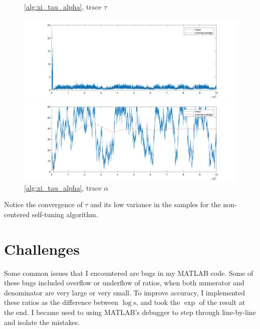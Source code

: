 \documentclass{siamart1116}
\begin{document}
\begin{figure}[!htb]
    \begin{minipage}{0.48\textwidth}
        \centering
        \caption{\label{fig:moon_noncentered_tau} \cref{alg:xi_tau_alpha}, trace $\tau$}
        \includegraphics[width=\linewidth]{graphics/moons/noncentered/trace_tau.png}
    \end{minipage} \hfill
    \begin{minipage}{0.48\textwidth}
        \centering
        \caption{\label{fig:moon_noncentered_alpha} \cref{alg:xi_tau_alpha}, trace $\alpha$}
        \includegraphics[width=\linewidth]{graphics/moons/noncentered/trace_alpha.png}
    \end{minipage}
\end{figure}

Notice the convergence of $\tau$ and its low variance in the samples for the non-centered self-tuning algorithm.

\section{Challenges}
Some common issues that I encountered are bugs in my MATLAB code. Some of these bugs included overflow or underflow of ratios, when both numerator and denominator are very large or very small. To improve accuracy, I implemented these ratios as the difference between $\log$s, and took the $\exp$ of the result at the end. I became used to using MATLAB's debugger to step through line-by-line and isolate the mistakes.
\end{document}

